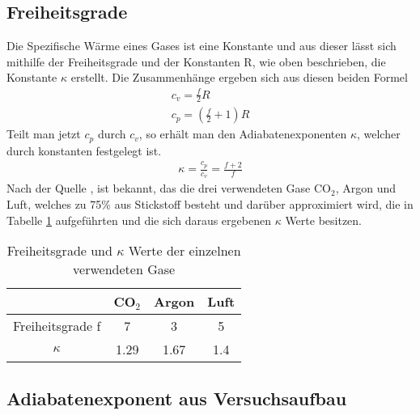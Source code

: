 \documentclass[12pt,a4paper,titlepage,headinclude,bibtotoc]{scrartcl}
\begin{document}
\subsection{Freiheitsgrade}
Die Spezifische Wärme eines Gases ist eine Konstante und aus dieser lässt sich mithilfe der Freiheitsgrade und der Konstanten R, wie oben beschrieben, die Konstante $\kappa$ erstellt.
Die Zusammenhänge ergeben sich aus diesen beiden Formel %
\begin{align}
	c_v=\frac{f}{2}R\\
	c_p=\left(\frac{f}{2}+1\right)R
\end{align}
Teilt man jetzt $c_p$ durch $c_v$, so erhält man den Adiabatenexponenten $\kappa$, welcher durch konstanten festgelegt ist.
\begin{align}
	\kappa=\frac{c_p}{c_v}=\frac{f+2}{f}
\end{align}
Nach der Quelle %
, ist bekannt, das die drei verwendeten Gase CO$_2$, Argon und Luft, welches zu 75\% aus Stickstoff besteht und darüber approximiert wird, die in Tabelle \ref{tab:kappafrei} aufgeführten und die sich daraus ergebenen $\kappa$ Werte besitzen.
\begin{table}[!h]
\centering
\begin{tabular}{|c|c|c|c|}
	\hline
				& CO$_2$	& Argon		& Luft\\
	\hline\hline
	Freiheitsgrade f	& 7		& 3		& 5\\
	$\kappa$		& 1.29		& 1.67		& 1.4\\
	\hline
\end{tabular}
\caption{Freiheitsgrade und $\kappa$ Werte der einzelnen verwendeten Gase}
\label{tab:kappafrei}
\end{table}

\subsection{Adiabatenexponent aus Versuchsaufbau}
\end{document}
